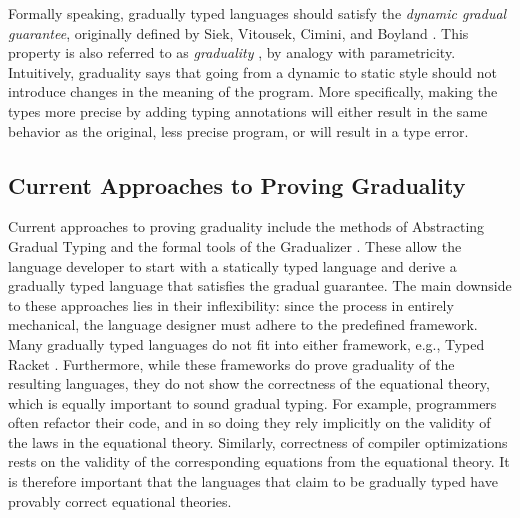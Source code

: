 Formally speaking, gradually typed languages should satisfy the 
\emph{dynamic gradual guarantee}, originally defined by Siek, Vitousek, Cimini,
and Boyland \cite{siek_et_al:LIPIcs:2015:5031}.
This property is also referred to as \emph{graduality} \cite{new-ahmed2018}, by analogy with parametricity.
Intuitively, graduality says that going from a dynamic to static style should not
introduce changes in the meaning of the program.
More specifically, making the types more precise by adding typing annotations
will either result in the same behavior as the original, less precise program,
or will result in a type error.


\subsection{Current Approaches to Proving Graduality}
Current approaches to proving graduality include the methods of Abstracting Gradual Typing
\cite{garcia-clark-tanter2016} and the formal tools of the Gradualizer \cite{cimini-siek2016}.
These allow the language developer to start with a statically typed language and derive a
gradually typed language that satisfies the gradual guarantee. The main downside to
these approaches lies in their inflexibility: since the process in entirely mechanical,
the language designer must adhere to the predefined framework.
Many gradually typed languages do not fit into either framework, e.g., Typed Racket
\cite{tobin-hochstadt06, tobin-hochstadt08}.
%
Furthermore, while these frameworks do prove
graduality of the resulting languages, they do not show the correctness of the equational theory,
which is equally important to sound gradual typing. For example, programmers often refactor their
code, and in so doing they rely implicitly on the validity of the laws in the equational theory.
Similarly, correctness of compiler optimizations rests on the validity of the corresponding equations
from the equational theory. It is therefore important that the languages that claim to be gradually typed
have provably correct equational theories.



